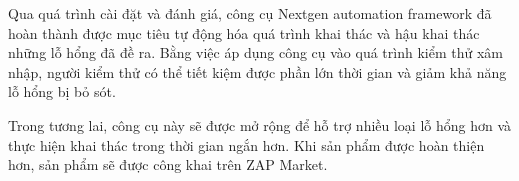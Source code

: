 \documentclass[./../main.tex]{subfiles}
\begin{document}
Qua quá trình cài đặt và đánh giá, công cụ Nextgen automation framework
đã hoàn thành được mục tiêu tự động hóa quá trình khai thác và hậu khai
thác những lỗ hổng đã đề ra. Bằng việc áp dụng công cụ vào quá trình
kiểm thử xâm nhập, người kiểm thử có thể tiết kiệm được phần lớn
thời gian và giảm khả năng lỗ hổng bị bỏ sót.

Trong tương lai, công cụ này sẽ được mở rộng để hỗ trợ nhiều loại
lỗ hổng hơn và thực hiện khai thác trong thời gian ngắn hơn.
Khi sản phẩm được hoàn thiện hơn, sản phẩm sẽ được công khai trên ZAP Market.
\end{document}
